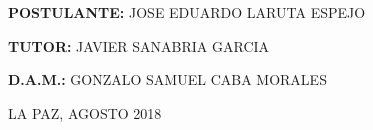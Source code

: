 \begin{titlepage}
\begin{center}
    \vspace*{0.2in}
    
    \begin{large}
    \textbf{POSTULANTE:} JOSE EDUARDO LARUTA ESPEJO\\
    \end{large}
    
    \begin{large}
    \hspace{0.08in} \textbf{TUTOR:} JAVIER SANABRIA GARCIA\\
    \end{large}
    
    \begin{large}
    \hspace{0.44in} \textbf{D.A.M.:} GONZALO SAMUEL CABA MORALES\\
    \end{large}
    
    \vspace*{0.2in}
    
    \begin{normalsize}
    LA PAZ, AGOSTO 2018\\
    \end{normalsize}
    \end{center}
    \end{titlepage}
    
    
    \thispagestyle{empty}